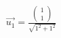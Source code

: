 \documentclass[preview]{standalone}
\begin{document}
\begin{align*}
\vec{u_1} = \frac{\begin{pmatrix} 1 \\ 1 \end{pmatrix}}{\sqrt{1^2 + 1^2}}
\end{align*}
\end{document}

